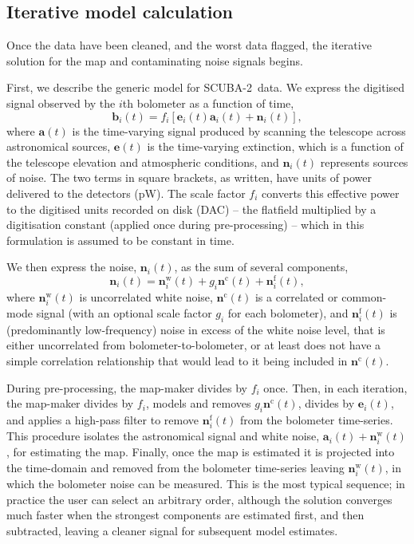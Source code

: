 \documentclass[useAMS,usenatbib,nofootinbib]{mn2e}
\newcommand{\scuba}{SCUBA-2}
\begin{document}
\subsection{Iterative model calculation}
\label{sec:components}

Once the data have been cleaned, and the worst data flagged, the
iterative solution for the map and contaminating noise signals begins.

First, we describe the generic model for \scuba\ data. We express the
digitised signal observed by the $i$th bolometer as a function of
time,
%
\begin{equation}
\mathbf{b}_i(t) = f_i[\mathbf{e}_i(t) \mathbf{a}_i(t) + \mathbf{n}_i(t)],
\label{eq:model}
\end{equation}
%
where $\mathbf{a}(t)$ is the time-varying signal produced by scanning
the telescope across astronomical sources, $\mathbf{e}(t)$ is the
time-varying extinction, which is a function of the telescope
elevation and atmospheric conditions, and $\mathbf{n}_i(t)$ represents
sources of noise. The two terms in square brackets, as written, have
units of power delivered to the detectors (pW). The scale factor $f_i$
converts this effective power to the digitised units recorded on disk
(DAC) -- the flatfield multiplied by a digitisation constant (applied
once during pre-processing) -- which in this formulation is assumed to
be constant in time.

We then express the noise, $\mathbf{n}_i(t)$, as the sum of several
components,
%
\begin{equation}
  \mathbf{n}_i(t) = \mathbf{n}^\mathrm{w}_i(t) +
  g_i\mathbf{n}^\mathrm{c}(t) + \mathbf{n}^\mathrm{f}_i(t),
\label{eq:noise}
\end{equation}
%
where $\mathbf{n}^\mathrm{w}_i(t)$ is uncorrelated white noise,
$\mathbf{n}^\mathrm{c}(t)$ is a correlated or common-mode signal (with
an optional scale factor $g_i$ for each bolometer), and
$\mathbf{n}^\mathrm{f}_i(t)$ is (predominantly low-frequency) noise in
excess of the white noise level, that is either uncorrelated from
bolometer-to-bolometer, or at least does not have a simple correlation
relationship that would lead to it being included in
$\mathbf{n}^\mathrm{c}(t)$.

During pre-processing, the map-maker divides by $f_i$ once. Then, in
each iteration, the map-maker divides by $f_i$, models and removes
$g_i\mathbf{n}^\mathrm{c}(t)$, divides by $\mathbf{e}_i(t)$, and
applies a high-pass filter to remove $\mathbf{n}^\mathrm{f}_i(t)$ from
the bolometer time-series. This procedure isolates the astronomical
signal and white noise, $\mathbf{a}_i(t) +
\mathbf{n}^\mathrm{w}_i(t)$, for estimating the map. Finally, once the
map is estimated it is projected into the time-domain and removed from
the bolometer time-series leaving $\mathbf{n}^\mathrm{w}_i(t)$, in
which the bolometer noise can be measured. This is the most typical
sequence; in practice the user can select an arbitrary order, although
the solution converges much faster when the strongest components are
estimated first, and then subtracted, leaving a cleaner signal for
subsequent model estimates.
\end{document}
